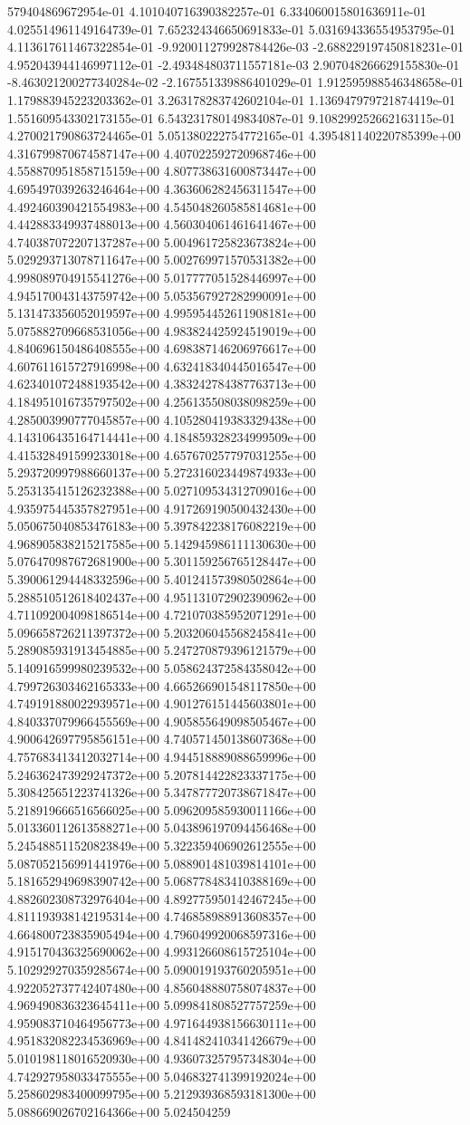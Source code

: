579404869672954e-01	4.101040716390382257e-01	6.334060015801636911e-01	4.025514961149164739e-01	7.652324346650691833e-01	5.031694336554953795e-01	4.113617611467322854e-01	-9.920011279928784426e-03	-2.688229197450818231e-01	4.952043944146997112e-01	-2.493484803711557181e-03	2.907048266629155830e-01	-8.463021200277340284e-02	-2.167551339886401029e-01	1.912595988546348658e-01	1.179883945223203362e-01	3.263178283742602104e-01	1.136947979721874419e-01	1.551609543302173155e-01	6.543231780149834087e-01	9.108299252662163115e-01	4.270021790863724465e-01	5.051380222754772165e-01
4.395481140220785399e+00	4.316799870674587147e+00	4.407022592720968746e+00	4.558870951858715159e+00	4.807738631600873447e+00	4.695497039263246464e+00	4.363606282456311547e+00	4.492460390421554983e+00	4.545048260585814681e+00	4.442883349937488013e+00	4.560304061461641467e+00	4.740387072207137287e+00	5.004961725823673824e+00	5.029293713078711647e+00	5.002769971570531382e+00	4.998089704915541276e+00	5.017777051528446997e+00	4.945170043143759742e+00	5.053567927282990091e+00	5.131473356052019597e+00	4.995954452611908181e+00	5.075882709668531056e+00	4.983824425924519019e+00	4.840696150486408555e+00	4.698387146206976617e+00	4.607611615727916998e+00	4.632418340445016547e+00	4.623401072488193542e+00	4.383242784387763713e+00	4.184951016735797502e+00	4.256135508038098259e+00	4.285003990777045857e+00	4.105280419383329438e+00	4.143106435164714441e+00	4.184859328234999509e+00	4.415328491599233018e+00	4.657670257797031255e+00	5.293720997988660137e+00	5.272316023449874933e+00	5.253135415126232388e+00	5.027109534312709016e+00	4.935975445357827951e+00	4.917269190500432430e+00	5.050675040853476183e+00	5.397842238176082219e+00	4.968905838215217585e+00	5.142945986111130630e+00	5.076470987672681900e+00	5.301159256765128447e+00	5.390061294448332596e+00	5.401241573980502864e+00	5.288510512618402437e+00	4.951131072902390962e+00	4.711092004098186514e+00	4.721070385952071291e+00	5.096658726211397372e+00	5.203206045568245841e+00	5.289085931913454885e+00	5.247270879396121579e+00	5.140916599980239532e+00	5.058624372584358042e+00	4.799726303462165333e+00	4.665266901548117850e+00	4.749191880022939571e+00	4.901276151445603801e+00	4.840337079966455569e+00	4.905855649098505467e+00	4.900642697795856151e+00	4.740571450138607368e+00	4.757683413412032714e+00	4.944518889088659996e+00	5.246362473929247372e+00	5.207814422823337175e+00	5.308425651223741326e+00	5.347877720738671847e+00	5.218919666516566025e+00	5.096209585930011166e+00	5.013360112613588271e+00	5.043896197094456468e+00	5.245488511520823849e+00	5.322359406902612555e+00	5.087052156991441976e+00	5.088901481039814101e+00	5.181652949698390742e+00	5.068778483410388169e+00	4.882602308732976404e+00	4.892775950142467245e+00	4.811193938142195314e+00	4.746858988913608357e+00	4.664800723835905494e+00	4.796049920068597316e+00	4.915170436325690062e+00	4.993126608615725104e+00	5.102929270359285674e+00	5.090019193760205951e+00	4.922052737742407480e+00	4.856048880758074837e+00	4.969490836323645411e+00	5.099841808527757259e+00	4.959083710464956773e+00	4.971644938156630111e+00	4.951832082234536969e+00	4.841482410341426679e+00	5.010198118016520930e+00	4.936073257957348304e+00	4.742927958033475555e+00	5.046832741399192024e+00	5.258602983400099795e+00	5.212939368593181300e+00	5.088669026702164366e+00	5.024504259